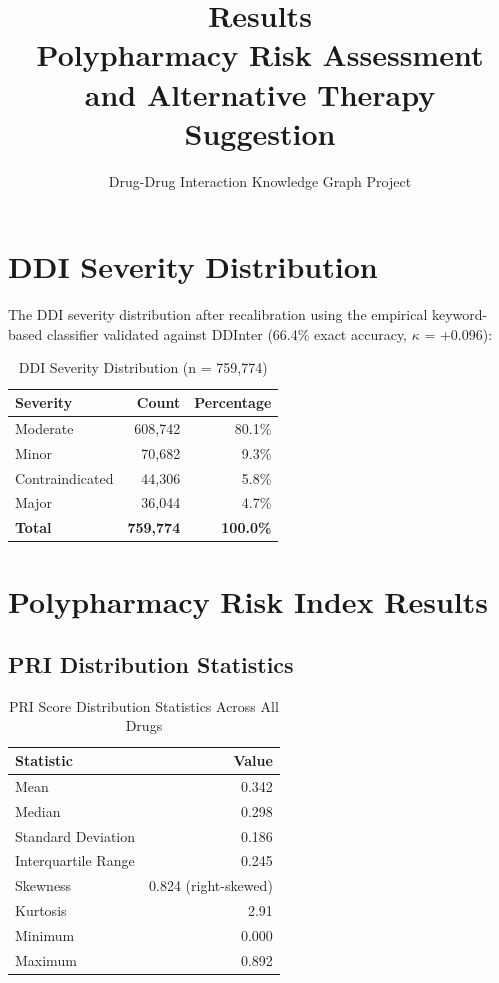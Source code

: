 \documentclass[11pt,a4paper]{article}
\title{\textbf{Results}\\
\large Polypharmacy Risk Assessment and Alternative Therapy Suggestion}
\author{Drug-Drug Interaction Knowledge Graph Project}
\date{}
\begin{document}
\maketitle

\tableofcontents
\newpage

\section{DDI Severity Distribution}

The DDI severity distribution after recalibration using the empirical keyword-based classifier validated against DDInter (66.4\% exact accuracy, $\kappa$ = +0.096):

\begin{table}[H]
\centering
\caption{DDI Severity Distribution (n = 759,774)}
\label{tab:severity_distribution}
\begin{tabular}{lrr}
\toprule
\textbf{Severity} & \textbf{Count} & \textbf{Percentage} \\
\midrule
Moderate & 608,742 & 80.1\% \\
Minor & 70,682 & 9.3\% \\
Contraindicated & 44,306 & 5.8\% \\
Major & 36,044 & 4.7\% \\
\midrule
\textbf{Total} & \textbf{759,774} & \textbf{100.0\%} \\
\bottomrule
\end{tabular}
\end{table}

\section{Polypharmacy Risk Index Results}

\subsection{PRI Distribution Statistics}

\begin{table}[H]
\centering
\caption{PRI Score Distribution Statistics Across All Drugs}
\label{tab:pri_stats}
\begin{tabular}{lr}
\toprule
\textbf{Statistic} & \textbf{Value} \\
\midrule
Mean & 0.342 \\
Median & 0.298 \\
Standard Deviation & 0.186 \\
Interquartile Range & 0.245 \\
Skewness & 0.824 (right-skewed) \\
Kurtosis & 2.91 \\
Minimum & 0.000 \\
Maximum & 0.892 \\
\bottomrule
\end{tabular}
\end{table}
\end{document}
